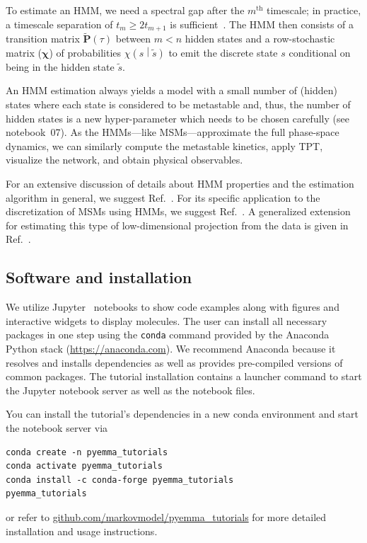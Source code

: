 \documentclass[9pt,tutorial]{livecoms}
\newcommand{\githubrepository}{\url{github.com/markovmodel/pyemma_tutorials}}
\begin{document}
To estimate an HMM, we need a spectral gap after the $m^\textrm{th}$ timescale;
in practice, a timescale separation of $t_m \geq 2t_{m+1}$ is sufficient~\cite{pyemma}.
The HMM then consists of a transition matrix $\tilde{\mathbf{P}}(\tau)$ between $m<n$ hidden states
and a row-stochastic matrix ($\bm{\chi}$) of probabilities $\chi\left( s \middle| \tilde{s} \right)$
to emit the discrete state $s$ conditional on being in the hidden state $\tilde{s}$.

An HMM estimation always yields a model with a small number of (hidden) states
where each state is considered to be metastable and,
thus, the number of hidden states is a new hyper-parameter which needs to be chosen carefully (see notebook~07).
As the HMMs---like MSMs---approximate the full phase-space dynamics,
we can similarly compute the metastable kinetics, apply TPT, visualize the network, and obtain physical observables.

For an extensive discussion of details about HMM properties and the estimation algorithm in general, we suggest Ref.~\cite{hmm-tutorial}.
For its specific application to the discretization of MSMs using HMMs, we suggest Ref.~\cite{noe-proj-hid-msm}. A generalized extension for estimating this type of low-dimensional projection from the data is given in Ref.~\cite{wu2015projected}.

\subsection{Software and installation}

We utilize Jupyter~\cite{jupyter} notebooks to show code examples along with figures and interactive widgets to display molecules.
The user can install all necessary packages in one step using the \texttt{conda} command provided by the Anaconda Python stack (\url{https://anaconda.com}).
We recommend Anaconda because it resolves and installs dependencies as well as provides pre-compiled versions of common packages.
The tutorial installation contains a launcher command to start the Jupyter notebook server as well as the notebook files.

You can install the tutorial's dependencies in a new conda environment and start the notebook server via
\begin{verbatim}
conda create -n pyemma_tutorials
conda activate pyemma_tutorials
conda install -c conda-forge pyemma_tutorials
pyemma_tutorials
\end{verbatim}
or refer to \githubrepository{} for more detailed installation and usage instructions.
\end{document}
